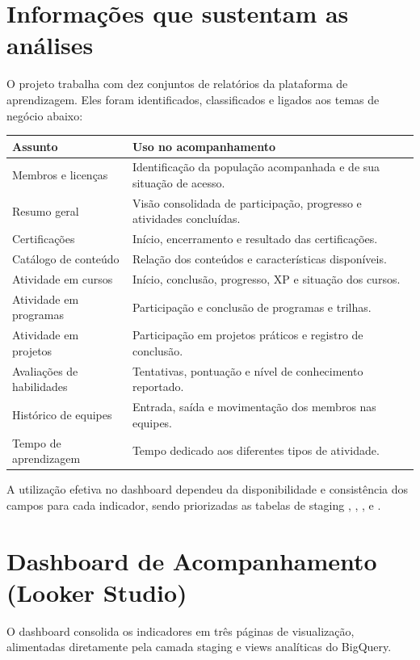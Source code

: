 \documentclass[11pt,a4paper]{article}
\begin{document}
\section{Informações que sustentam as análises}

O projeto trabalha com dez conjuntos de relatórios da plataforma de
aprendizagem. Eles foram identificados, classificados e ligados aos temas de
negócio abaixo:

\begin{tabularx}{\textwidth}{L{49mm}Y}
\toprule
\textbf{Assunto} & \textbf{Uso no acompanhamento} \\
\midrule
Membros e licenças & Identificação da população acompanhada e de sua situação de acesso. \\
Resumo geral & Visão consolidada de participação, progresso e atividades concluídas. \\
Certificações & Início, encerramento e resultado das certificações. \\
Catálogo de conteúdo & Relação dos conteúdos e características disponíveis. \\
Atividade em cursos & Início, conclusão, progresso, XP e situação dos cursos. \\
Atividade em programas & Participação e conclusão de programas e trilhas. \\
Atividade em projetos & Participação em projetos práticos e registro de conclusão. \\
Avaliações de habilidades & Tentativas, pontuação e nível de conhecimento reportado. \\
Histórico de equipes & Entrada, saída e movimentação dos membros nas equipes. \\
Tempo de aprendizagem & Tempo dedicado aos diferentes tipos de atividade. \\
\bottomrule
\end{tabularx}

A utilização efetiva no dashboard dependeu da disponibilidade e consistência
dos campos para cada indicador, sendo priorizadas as tabelas de staging
, , ,
 e .

\section{Dashboard de Acompanhamento (Looker Studio)}

O dashboard consolida os indicadores em três páginas de visualização,
alimentadas diretamente pela camada staging e views analíticas do BigQuery.
\end{document}

